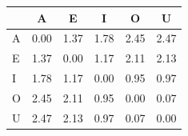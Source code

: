 \begin{tabular}{lccccc}
\toprule
\rowcolor{col01}
 & A & E & I & O & U \\
\midrule
A & 0.00 & 1.37 & 1.78 & 2.45 & 2.47 \\
E & 1.37 & 0.00 & 1.17 & 2.11 & 2.13 \\
I & 1.78 & 1.17 & 0.00 & 0.95 & 0.97 \\
O & 2.45 & 2.11 & 0.95 & 0.00 & 0.07 \\
U & 2.47 & 2.13 & 0.97 & 0.07 & 0.00 \\
\bottomrule
\end{tabular}
